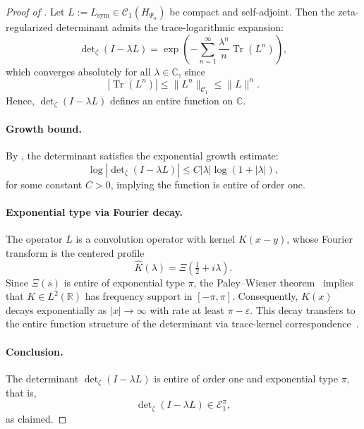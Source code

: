 \begin{proof}[Proof of ]
Let \( L := L_{\mathrm{sym}} \in \mathcal{C}_1(H_{\Psi_\alpha}) \) be compact and self-adjoint. Then the zeta-regularized determinant admits the trace-logarithmic expansion:
\[
\det\nolimits_\zeta(I - \lambda L)
= \exp\left( - \sum_{n=1}^\infty \frac{\lambda^n}{n} \operatorname{Tr}(L^n) \right),
\]
which converges absolutely for all \( \lambda \in \mathbb{C} \), since
\[
|\operatorname{Tr}(L^n)| \le \|L^n\|_{\mathcal{C}_1} \le \|L\|^n.
\]
Hence, \( \det\nolimits_\zeta(I - \lambda L) \) defines an entire function on \( \mathbb{C} \).

\paragraph{Growth bound.}
By , the determinant satisfies the exponential growth estimate:
\[
\log \left| \det\nolimits_\zeta(I - \lambda L) \right|
\le C |\lambda| \log(1 + |\lambda|),
\]
for some constant \( C > 0 \), implying the function is entire of order one.

\paragraph{Exponential type via Fourier decay.}
The operator \( L \) is a convolution operator with kernel \( K(x - y) \), whose Fourier transform is the centered profile
\[
\widehat{K}(\lambda) = \Xi\left( \tfrac{1}{2} + i\lambda \right).
\]
Since \( \Xi(s) \) is entire of exponential type \( \pi \), the Paley--Wiener theorem~\cite[Ch.~9]{Levin1996EntireLectures} implies that \( K \in L^2(\mathbb{R}) \) has frequency support in \( [-\pi, \pi] \). Consequently, \( K(x) \) decays exponentially as \( |x| \to \infty \) with rate at least \( \pi - \varepsilon \). This decay transfers to the entire function structure of the determinant via trace-kernel correspondence~\cite[Ch.~3--4]{Simon2005TraceIdeals}.

\paragraph{Conclusion.}
The determinant \( \det\nolimits_\zeta(I - \lambda L) \) is entire of order one and exponential type \( \pi \), that is,
\[
\det\nolimits_\zeta(I - \lambda L) \in \mathcal{E}_1^\pi,
\]
as claimed.
\end{proof}
